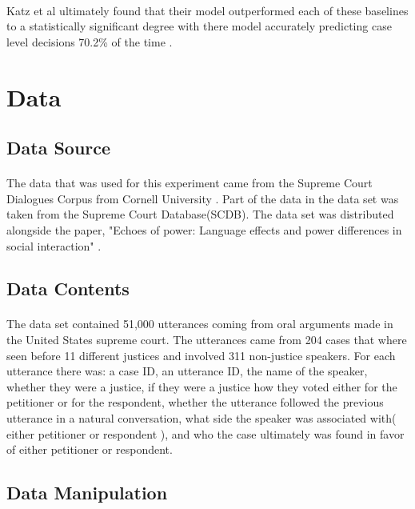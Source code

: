 \documentclass[12pt,english]{article}
\begin{document}
\paragraph{}
Katz et al ultimately found that their model outperformed each of these baselines to a statistically significant degree with there model accurately predicting case level decisions 70.2\% of the time . 
\section{Data}
\subsection{Data Source}
\paragraph{}
The data that was used for this experiment came from the Supreme Court Dialogues Corpus from Cornell University \citep{noauthor_supreme_nodate}. Part of the data in the data set was taken from the Supreme Court Database(SCDB). The data set was distributed alongside the paper, "Echoes of power: Language effects and power differences in social interaction"   \citep{danescu-niculescu-mizil_echoes_2012}.
\subsection{Data Contents}
\paragraph{}
The data set contained 51,000 utterances coming from oral arguments made in the United States supreme court. The utterances came from 204 cases that where seen before 11 different justices and involved 311 non-justice speakers. For each utterance there was: a case ID, an utterance ID, the name of the speaker, whether they were a justice, if they were a justice how they voted either for the petitioner or for the respondent, whether the utterance followed the previous utterance in a natural conversation, what side the speaker was associated with( either petitioner or  respondent ), and who the case ultimately was found in favor of either petitioner or respondent.
\subsection{Data Manipulation}
\end{document}
